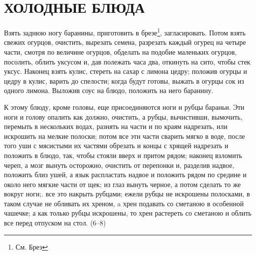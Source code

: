 \section{ХОЛОДНЫЕ БЛЮДА} %

Взять заднюю ногу баранины, приготовить в брезе\footnote{См. Брез}, загласировать. Потом взять свежих огурцов, очистить, вырезать семена, разрезать каждый огурец на четыре части, смотря по величине огурцов, обделать на подобие маленьких огурцов, посолить, облить уксусом и, дав полежать часа два, откинуть на сито, чтобы стек уксус. Наконец взять кулис, стереть на сахар с лимона цедру; положив огурцы и цедру в кулис, варить до спелости; когда будут готовы, выжать в огурцы сок из одного лимона. Выложив соус на блюдо, положить на него баранину.


К этому блюду, кроме головы, еще присоединяются ноги и рубцы бараньи. Эти ноги и голову опалить как должно, очистить, а рубцы, вычистивши, вымочить, перемыть в нескольких водах, разнять на части и по краям надрезать, или искрошить на мелкие полоски; потом все эти части сварить мягко в воде, после того уши с мясистыми их частями обрезать и концы с хрящей надрезать и положить в блюдо, так, чтобы стояли вверх и притом рядом; наконец взломить череп, а мозг вынуть осторожно, очистить от перепонки и, разделив надвое, положить близ ушей, а язык распластать надвое и положить рядом по средине и около него мягкие части от щек; из глаз вынуть черное, а потом сделать то же вокруг ноги;. все это накрыть рубцами; ежели рубцы не искрошены полосками, в таком случае не обливать их хреном, a хрен подавать со сметаною в особенной чашечке; а как только рубцы искрошены, то хрен растереть со сметаною и облить все перед отпуском на стол. (6–8)


